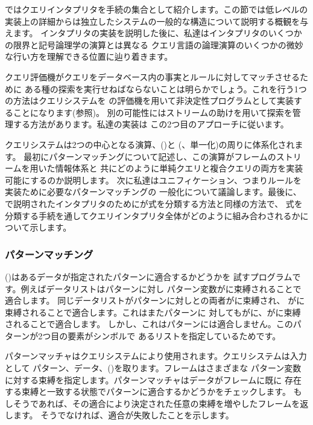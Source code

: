 ではクエリインタプリタを手続の集合として紹介します。この節では低レベルの
実装上の詳細からは独立したシステムの一般的な構造について説明する概観を与えます。
インタプリタの実装を説明した後に、私達はインタプリタのいくつかの限界と記号論理学の演算とは異なる
クエリ言語の論理演算のいくつかの微妙な行い方を理解できる位置に辿り着きます。

クエリ評価機がクエリをデータベース内の事実とルールに対してマッチさせるために
ある種の探索を実行せねばならないことは明らかでしょう。これを行う1つの方法はクエリシステムを
の評価機を用いて非決定性プログラムとして実装することになります(参照)。
別の可能性にはストリームの助けを用いて探索を管理する方法があります。私達の実装は
この2つ目のアプローチに従います。

クエリシステムは2つの中心となる演算、()と
(、単一化)の周りに体系化されます。
最初にパターンマッチングについて記述し、この演算がフレームのストリームを用いた情報体系と
共にどのように単純クエリと複合クエリの両方を実装可能にするのか説明します。
次に私達はユニフィケーション、つまりルールを実装ために必要なパターンマッチングの
一般化について議論します。最後に、
で説明されたインタプリタのためにが式を分類する方法と同様の方法で、
式を分類する手続を通してクエリインタプリタ全体がどのように組み合わされるかについて示します。

\subsubsection*{パターンマッチング}

()はあるデータが指定されたパターンに適合するかどうかを
試すプログラムです。例えばデータリストはパターンに対し
パターン変数がに束縛されることで適合します。
同じデータリストがパターンに対しとの両者がに束縛され、
がに束縛されることで適合します。これはまたパターンに
対してもがに、がに束縛されることで適合します。
しかし、これはパターンには適合しません。このパターンが2つ目の要素がシンボルで
あるリストを指定しているためです。

パターンマッチャはクエリシステムにより使用されます。クエリシステムは入力として
パターン、データ、()を取ります。フレームはさまざまな
パターン変数に対する束縛を指定します。パターンマッチャはデータがフレームに既に
存在する束縛と一致する状態でパターンに適合するかどうかをチェックします。
もしそうであれば、その適合により決定された任意の束縛を増やしたフレームを返します。
そうでなければ、適合が失敗したことを示します。

